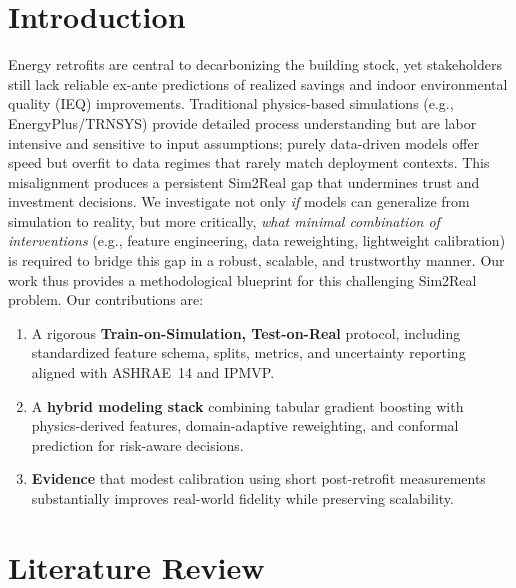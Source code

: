 ﻿\documentclass{article}
\begin{document}
\section{Introduction}
Energy retrofits are central to decarbonizing the building stock, yet stakeholders still lack reliable ex-ante predictions of realized savings and indoor environmental quality (IEQ) improvements.
Traditional physics-based simulations (e.g., EnergyPlus/TRNSYS) provide detailed process understanding but are labor intensive and sensitive to input assumptions;
purely data-driven models offer speed but overfit to data regimes that rarely match deployment contexts.
This misalignment produces a persistent Sim2Real gap that undermines trust and investment decisions.
We investigate not only \emph{if} models can generalize from simulation to reality, but more critically, \emph{what minimal combination of interventions} (e.g., feature engineering, data reweighting, lightweight calibration) is required to bridge this gap in a robust, scalable, and trustworthy manner. Our work thus provides a methodological blueprint for this challenging Sim2Real problem.
Our contributions are:
\begin{enumerate}[leftmargin=8mm]
\item A rigorous \textbf{Train-on-Simulation, Test-on-Real} protocol, including standardized feature schema, splits, metrics, and uncertainty reporting aligned with ASHRAE~14 and IPMVP.
\item A \textbf{hybrid modeling stack} combining tabular gradient boosting with physics-derived features, domain-adaptive reweighting, and conformal prediction for risk-aware decisions.
\item \textbf{Evidence} that modest calibration using short post-retrofit measurements substantially improves real-world fidelity while preserving scalability.
\end{enumerate}

\section{Literature Review}
\end{document}
